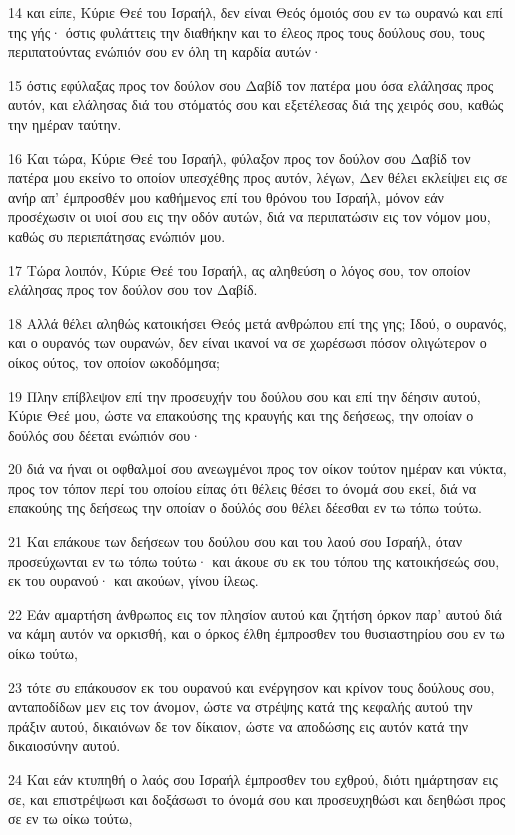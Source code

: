\par 14 και είπε, Κύριε Θεέ του Ισραήλ, δεν είναι Θεός όμοιός σου εν τω ουρανώ και επί της γής· όστις φυλάττεις την διαθήκην και το έλεος προς τους δούλους σου, τους περιπατούντας ενώπιόν σου εν όλη τη καρδία αυτών·
\par 15 όστις εφύλαξας προς τον δούλον σου Δαβίδ τον πατέρα μου όσα ελάλησας προς αυτόν, και ελάλησας διά του στόματός σου και εξετέλεσας διά της χειρός σου, καθώς την ημέραν ταύτην.
\par 16 Και τώρα, Κύριε Θεέ του Ισραήλ, φύλαξον προς τον δούλον σου Δαβίδ τον πατέρα μου εκείνο το οποίον υπεσχέθης προς αυτόν, λέγων, Δεν θέλει εκλείψει εις σε ανήρ απ' έμπροσθέν μου καθήμενος επί του θρόνου του Ισραήλ, μόνον εάν προσέχωσιν οι υιοί σου εις την οδόν αυτών, διά να περιπατώσιν εις τον νόμον μου, καθώς συ περιεπάτησας ενώπιόν μου.
\par 17 Τώρα λοιπόν, Κύριε Θεέ του Ισραήλ, ας αληθεύση ο λόγος σου, τον οποίον ελάλησας προς τον δούλον σου τον Δαβίδ.
\par 18 Αλλά θέλει αληθώς κατοικήσει Θεός μετά ανθρώπου επί της γης; Ιδού, ο ουρανός, και ο ουρανός των ουρανών, δεν είναι ικανοί να σε χωρέσωσι πόσον ολιγώτερον ο οίκος ούτος, τον οποίον ωκοδόμησα;
\par 19 Πλην επίβλεψον επί την προσευχήν του δούλου σου και επί την δέησιν αυτού, Κύριε Θεέ μου, ώστε να επακούσης της κραυγής και της δεήσεως, την οποίαν ο δούλός σου δέεται ενώπιόν σου·
\par 20 διά να ήναι οι οφθαλμοί σου ανεωγμένοι προς τον οίκον τούτον ημέραν και νύκτα, προς τον τόπον περί του οποίου είπας ότι θέλεις θέσει το όνομά σου εκεί, διά να επακούης της δεήσεως την οποίαν ο δούλός σου θέλει δέεσθαι εν τω τόπω τούτω.
\par 21 Και επάκουε των δεήσεων του δούλου σου και του λαού σου Ισραήλ, όταν προσεύχωνται εν τω τόπω τούτω· και άκουε συ εκ του τόπου της κατοικήσεώς σου, εκ του ουρανού· και ακούων, γίνου ίλεως.
\par 22 Εάν αμαρτήση άνθρωπος εις τον πλησίον αυτού και ζητήση όρκον παρ' αυτού διά να κάμη αυτόν να ορκισθή, και ο όρκος έλθη έμπροσθεν του θυσιαστηρίου σου εν τω οίκω τούτω,
\par 23 τότε συ επάκουσον εκ του ουρανού και ενέργησον και κρίνον τους δούλους σου, ανταποδίδων μεν εις τον άνομον, ώστε να στρέψης κατά της κεφαλής αυτού την πράξιν αυτού, δικαιόνων δε τον δίκαιον, ώστε να αποδώσης εις αυτόν κατά την δικαιοσύνην αυτού.
\par 24 Και εάν κτυπηθή ο λαός σου Ισραήλ έμπροσθεν του εχθρού, διότι ημάρτησαν εις σε, και επιστρέψωσι και δοξάσωσι το όνομά σου και προσευχηθώσι και δεηθώσι προς σε εν τω οίκω τούτω,
